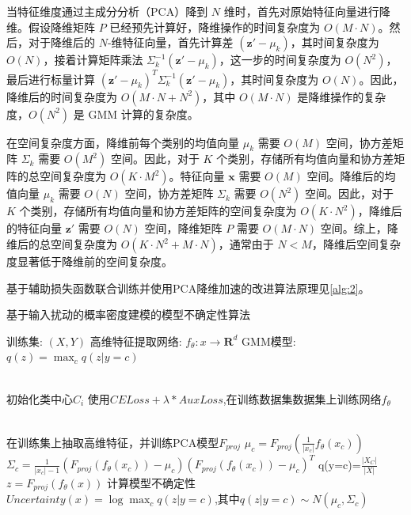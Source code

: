 当特征维度通过主成分分析（PCA）降到 \( N \) 维时，首先对原始特征向量进行降维。假设降维矩阵 \( P \) 已经预先计算好，降维操作的时间复杂度为 \( O(M \cdot N) \)。然后，对于降维后的 \( N \)-维特征向量，首先计算差 \( (\mathbf{z'} - \mu_k) \)，其时间复杂度为 \( O(N) \)，接着计算矩阵乘法 \( \Sigma_k^{-1} (\mathbf{z'} - \mu_k) \)，这一步的时间复杂度为 \( O(N^2) \)，最后进行标量计算 \( (\mathbf{z'} - \mu_k)^T \Sigma_k^{-1} (\mathbf{z'} - \mu_k) \)，其时间复杂度为 \( O(N) \)。因此，降维后的时间复杂度为 \( O(M \cdot N + N^2) \)，其中 \( O(M \cdot N) \) 是降维操作的复杂度，\( O(N^2) \) 是 GMM 计算的复杂度。

在空间复杂度方面，降维前每个类别的均值向量 \( \mu_k \) 需要 \( O(M) \) 空间，协方差矩阵 \( \Sigma_k \) 需要 \( O(M^2) \) 空间。因此，对于 \( K \) 个类别，存储所有均值向量和协方差矩阵的总空间复杂度为 \( O(K \cdot M^2) \)。特征向量 \( \mathbf{x} \) 需要 \( O(M) \) 空间。降维后的均值向量 \( \mu_k \) 需要 \( O(N) \) 空间，协方差矩阵 \( \Sigma_k \) 需要 \( O(N^2) \) 空间。因此，对于 \( K \) 个类别，存储所有均值向量和协方差矩阵的空间复杂度为 \( O(K \cdot N^2) \)，降维后的特征向量 \( \mathbf{z'} \) 需要 \( O(N) \) 空间，降维矩阵 \( P \) 需要 \( O(M \cdot N) \) 空间。综上，降维后的总空间复杂度为 \( O(K \cdot N^2 + M \cdot N) \)，通常由于 \( N < M \)，降维后空间复杂度显著低于降维前的空间复杂度。




基于辅助损失函数联合训练并使用PCA降维加速的改进算法原理见\ref{alg:2}。


\begin{algorithm}[h]
	\caption{基于输入扰动的概率密度建模的模型不确定性算法}
	\label{alg:2}
	
	\begin{algorithmic}[1]
		\Require 训练集: $(X,Y)$ 
		\Require 高维特征提取网络: $f_{\theta}:x \rightarrow \mathbf{R}^d $ 
		\Require GMM模型: $q(z) = \max_{c}q(z|y=c)$
		
		\\
            \State 初始化类中心$C_i$
		\State 使用$CELoss+\lambda*AuxLoss$,在训练数据集数据集上训练网络$f_{\theta}$


		\EndProcedure
            \\
        
		\State 在训练集上抽取高维特征，并训练PCA模型$F_{proj}$
		\State $\mu_{c}=F_{proj}(\frac{1}{|x_c|}f_{\theta}(x_c))$
		\State $\Sigma_c = \frac{1}{|x_c|-1}(F_{proj}(f_{\theta}(x_c))-\mu_c)(F_{proj}(f_{\theta}(x_c))-      \mu_c)^T$
		\State q(y=c)=$\frac{|X_C|}{|X|}$
            \EndFor
		\EndProcedure 
            \\

        
		\State $z=F_{proj}(f_{\theta}(x))$
		\State 计算模型不确定性 $Uncertainty(x) = \log \max_{c}q(z|y=c)$,其中$q(z|y=c)\sim N(\mu_c,\Sigma_c)$
		\EndProcedure 
	\end{algorithmic}
\end{algorithm}


